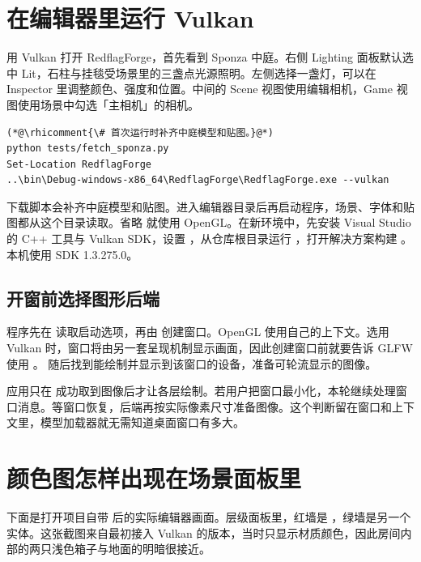 \clearpage
\section{在编辑器里运行 Vulkan}\label{impl:entry}
用 Vulkan 打开 RedflagForge，首先看到 Sponza 中庭。右侧 Lighting 面板默认选中 Lit，石柱与挂毯受场景里的三盏点光源照明。左侧选择一盏灯，可以在 Inspector 里调整颜色、强度和位置。中间的 Scene 视图使用编辑相机，Game 视图使用场景中勾选「主相机」的相机。

\begin{lstlisting}
(*@\rhicomment{\# 首次运行时补齐中庭模型和贴图。}@*)
python tests/fetch_sponza.py
Set-Location RedflagForge
..\bin\Debug-windows-x86_64\RedflagForge\RedflagForge.exe --vulkan
\end{lstlisting}

下载脚本会补齐中庭模型和贴图。进入编辑器目录后再启动程序，场景、字体和贴图都从这个目录读取。省略  就使用 OpenGL。在新环境中，先安装 Visual Studio 的 C++ 工具与 Vulkan SDK，设置 ，从仓库根目录运行 ，打开解决方案构建 。本机使用 SDK 1.3.275.0。

\subsection{开窗前选择图形后端}
程序先在  读取启动选项，再由  创建窗口。OpenGL 使用自己的上下文。选用 Vulkan 时，窗口将由另一套呈现机制显示画面，因此创建窗口前就要告诉 GLFW 使用 。 随后找到能绘制并显示到该窗口的设备，准备可轮流显示的图像。

应用只在  成功取到图像后才让各层绘制。若用户把窗口最小化，本轮继续处理窗口消息。等窗口恢复，后端再按实际像素尺寸准备图像。这个判断留在窗口和上下文里，模型加载器就无需知道桌面窗口有多大。




\clearpage
\section{颜色图怎样出现在场景面板里}
下面是打开项目自带  后的实际编辑器画面。层级面板里，红墙是 ，绿墙是另一个实体。这张截图来自最初接入 Vulkan 的版本，当时只显示材质颜色，因此房间内部的两只浅色箱子与地面的明暗很接近。

